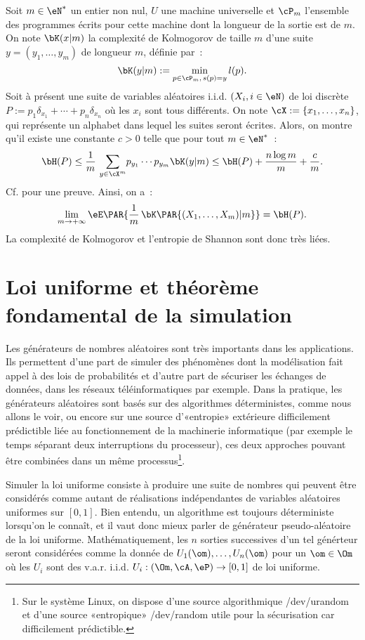 Soit $m\in\eN^*$ un entier non nul, $U$ une machine universelle et $\cP_m$
l'ensemble des programmes écrits pour cette machine dont la longueur de la
sortie est de $m$. On note $\bK(x|m)$ la complexité de Kolmogorov de taille
$m$ d'une suite $y=(y_1,\ldots,y_m)$ de longueur $m$, définie par~:
$$
\bK(y|m):=\min_{p\in\cP_m,\,s(p)=y} l(p).
$$
Soit à présent une suite de variables aléatoires i.i.d. $(X_i,i\in\eN)$ de
loi discrète $P:=p_1\delta_{x_1}+\cdots+p_n\delta_{x_n}$ où les $x_i$ sont tous
différents. On note $\cX:=\{x_1,\ldots,x_n\}$, qui représente un alphabet dans lequel
les suites seront écrites. Alors, on montre qu'il existe une constante $c>0$
telle que pour tout $m\in\eN^*$~:
$$
\bH(P) \leq\frac{1}{m}\,\sum_{y\in\cX^m}\! p_{y_1}\cdots p_{y_m} \bK(y|m)
\leq\bH(P)+\frac{n\log m}{m}+\frac{c}{m}.
$$
Cf. \cite[théorème 7.3.1 page 154]{cover-thomas} pour une preuve. Ainsi, on
a~:
$$
\lim_{m\to+\infty}\eE\PAR{\frac{1}{m}\,\bK\PAR{(X_1,\ldots,X_m)|m}}=\bH(P).
$$
La complexité de Kolmogorov et l'entropie de Shannon sont donc très liées.

%
\section{Loi uniforme et théorème fondamental de la simulation}
%

Les générateurs de nombres aléatoires sont très importants dans les
applications. Ils permettent d'une part de simuler des phénomènes dont la
modélisation fait appel à des lois de probabilités et d'autre part de
sécuriser les échanges de données, dans les réseaux téléinformatiques par
exemple. Dans la pratique, les générateurs aléatoires sont basés sur des
algorithmes déterministes, comme nous allons le voir, ou encore sur une source
d'«entropie» extérieure difficilement prédictible liée au fonctionnement de la
machinerie informatique (par exemple le temps séparant deux interruptions du
processeur), ces deux approches pouvant être combinées dans un même
processus\footnote{Sur le système Linux, on dispose d'une source algorithmique
  \textsf{/dev/urandom} et d'une source «entropique» \textsf{/dev/random}
  utile pour la sécurisation car difficilement prédictible.}.

Simuler la loi uniforme consiste à produire une suite de nombres qui peuvent
être considérés comme autant de réalisations indépendantes de variables
aléatoires uniformes sur $[0,1]$. Bien entendu, un algorithme est toujours
déterministe lorsqu'on le connaît, et il vaut donc mieux parler de générateur
pseudo-aléatoire de la loi uniforme. Mathématiquement, les $n$ sorties
successives d'un tel générteur seront considérées comme la donnée de
$U_1(\om),\dots,U_n(\om)$ pour un $\om\in\Om$ où les $U_i$ sont des v.a.r.
i.i.d. $U_i:(\Om,\cA,\eP)\to[0,1]$ de loi uniforme.

